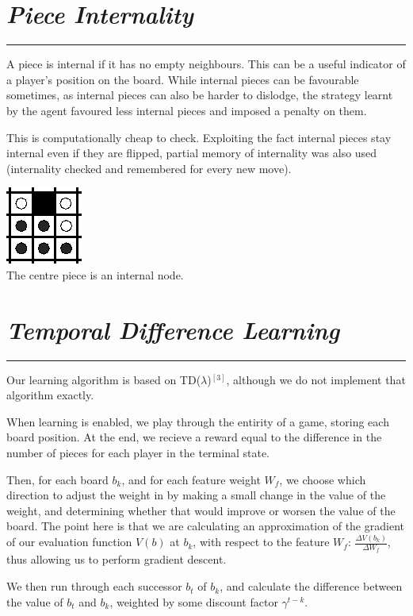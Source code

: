 \documentclass[10pt]{report}
\begin{document}
\begin{multicols}{2}
\section*{\emph{\textmd{Piece Internality}}}
\hrule

A piece is internal if it has no empty neighbours. This can be a useful indicator of a player's position on the board. While internal pieces can be favourable sometimes, as internal pieces can also be harder to dislodge, the strategy learnt by the agent favoured less internal pieces and imposed a penalty on them.

This is computationally cheap to check. Exploiting the fact internal pieces stay internal even if they are flipped, partial memory of internality was also used (internality checked and remembered for every new move).

\begin{center}
\includegraphics[scale=0.50]{internality.PNG}\\
The centre piece is an internal node.
\end{center}
\section*{\emph{Temporal Difference Learning}}
\hrule

Our learning algorithm is based on TD($\lambda$)$^{[3]}$, although we do not implement that algorithm exactly.

When learning is enabled, we play through the entirity of a game, storing each board position. At the end, we recieve a reward equal to the difference in the number of pieces for each player in the terminal state.

Then, for each board $b_k$, and for each feature weight $W_f$, we choose which direction to adjust the weight in by making a small change in the value of the weight, and determining whether that would improve or worsen the value of the board. The point here is that we are calculating an approximation of the gradient of our evaluation function $V(b)$ at $b_k$, with respect to the feature $W_f$: $\frac{\Delta V(b_k)}{\Delta W_f}$, thus allowing us to perform gradient descent.

We then run through each successor $b_t$ of $b_k$, and calculate the difference between the value of $b_t$ and $b_k$, weighted by some discount factor $\gamma^{t-k}$.


\end{multicols}
\end{document}
